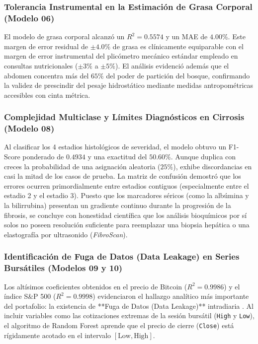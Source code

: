 \documentclass[12pt,letterpaper]{article}
\begin{document}
\subsubsection{Tolerancia Instrumental en la Estimación de Grasa Corporal (Modelo 06)}
El modelo de grasa corporal alcanzó un $R^2 = 0.5574$ y un MAE de $4.00\%$. Este margen de error residual de $\pm 4.0\%$ de grasa es clínicamente equiparable con el margen de error instrumental del plicómetro mecánico estándar empleado en consultas nutricionales ($\pm 3\%$ a $\pm 5\%$). El análisis evidenció además que el abdomen concentra más del $65\%$ del poder de partición del bosque, confirmando la validez de prescindir del pesaje hidrostático mediante medidas antropométricas accesibles con cinta métrica.

\subsubsection{Complejidad Multiclase y Límites Diagnósticos en Cirrosis (Modelo 08)}
Al clasificar los 4 estadios histológicos de severidad, el modelo obtuvo un F1-Score ponderado de $0.4934$ y una exactitud del $50.60\%$. Aunque duplica con creces la probabilidad de una asignación aleatoria ($25\%$), exhibe discordancias en casi la mitad de los casos de prueba. La matriz de confusión demostró que los errores ocurren primordialmente entre estadios contiguos (especialmente entre el estadio 2 y el estadio 3). Puesto que los marcadores séricos (como la albúmina y la bilirrubina) presentan un gradiente continuo durante la progresión de la fibrosis, se concluye con honestidad científica que los análisis bioquímicos por sí solos no poseen resolución suficiente para reemplazar una biopsia hepática o una elastografía por ultrasonido (\textit{FibroScan}).

\subsubsection{Identificación de Fuga de Datos (Data Leakage) en Series Bursátiles (Modelos 09 y 10)}
Los altísimos coeficientes obtenidos en el precio de Bitcoin ($R^2 = 0.9986$) y el índice S\&P 500 ($R^2 = 0.9998$) evidenciaron el hallazgo analítico más importante del portafolio: la existencia de **Fuga de Datos (Data Leakage)** intradiaria \cite{kapoor2023leakage}. Al incluir variables como las cotizaciones extremas de la sesión bursátil (\texttt{High} y \texttt{Low}), el algoritmo de Random Forest aprende que el precio de cierre (\texttt{Close}) está rígidamente acotado en el intervalo $[\text{Low}, \text{High}]$.
\end{document}
